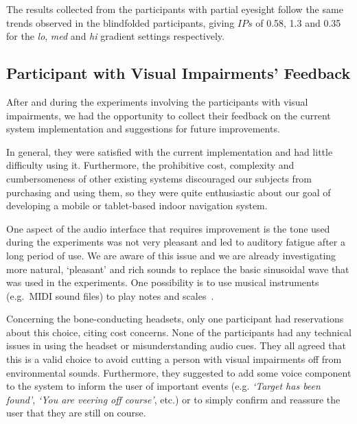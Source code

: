 \documentclass[sigconf, review=true, screen=true, anonymous=true]{acmart}
\begin{document}
The results collected from the participants with partial eyesight follow the same trends observed in the blindfolded participants, giving $IPs$ of 0.58, 1.3 and 0.35 for the \emph{lo}, \emph{med} and \emph{hi} gradient settings respectively.  

\subsection{Participant with Visual Impairments' Feedback}

After and during the experiments involving the participants with visual impairments, we had the opportunity to collect their feedback on the current system implementation and suggestions for future improvements.

In general, they were satisfied with the current implementation and had little difficulty using it.
Furthermore, the prohibitive cost, complexity and cumbersomeness of other existing systems discouraged our subjects from purchasing and using them, so they were quite enthusiastic about our goal of developing a mobile or tablet-based indoor navigation system. 

One aspect of the audio interface that requires improvement is the tone used during the experiments was not very pleasant and led to auditory fatigue after a long period of use.
We are aware of this issue and we are already investigating more natural, `pleasant' and rich sounds to replace the basic sinusoidal wave that was used in the experiments.
One possibility is to use musical instruments (e.g.\ MIDI sound files) to play notes and scales~\cite{brewster1998using}.

Concerning the bone-conducting headsets, only one participant had reservations about this choice, citing cost concerns.
None of the participants had any technical issues in using the headset or misunderstanding audio cues.
They all agreed that this is a valid choice to avoid cutting a person with visual impairments off from environmental sounds.
Furthermore, they suggested to add some voice component to the system to inform the user of important events (e.g. \emph{`Target has been found'}, \emph{`You are veering off course'}, etc.) or to simply confirm and reassure the user that they are still on course.

\end{document}
